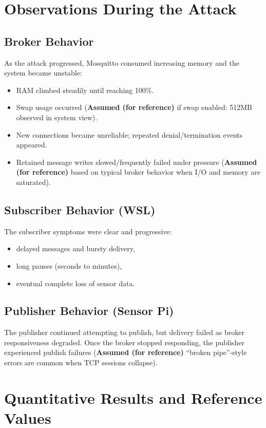 \documentclass[11pt]{article}
\begin{document}
\section{Observations During the Attack}
\subsection{Broker Behavior}
As the attack progressed, Mosquitto consumed increasing memory and the system became unstable:
\begin{itemize}
  \item RAM climbed steadily until reaching 100\%.
  \item Swap usage occurred (\textbf{Assumed (for reference)} if swap enabled: 512MB observed in system view).
  \item New connections became unreliable; repeated denial/termination events appeared.
  \item Retained message writes slowed/frequently failed under pressure (\textbf{Assumed (for reference)} based on typical broker behavior when I/O and memory are saturated).
\end{itemize}

\subsection{Subscriber Behavior (WSL)}
The subscriber symptoms were clear and progressive:
\begin{itemize}
  \item delayed messages and bursty delivery,
  \item long pauses (seconds to minutes),
  \item eventual complete loss of sensor data.
\end{itemize}

\subsection{Publisher Behavior (Sensor Pi)}
The publisher continued attempting to publish, but delivery failed as broker responsiveness degraded. Once the broker stopped responding, the publisher experienced publish failures (\textbf{Assumed (for reference)} ``broken pipe''-style errors are common when TCP sessions collapse).

\section{Quantitative Results and Reference Values}
\end{document}
